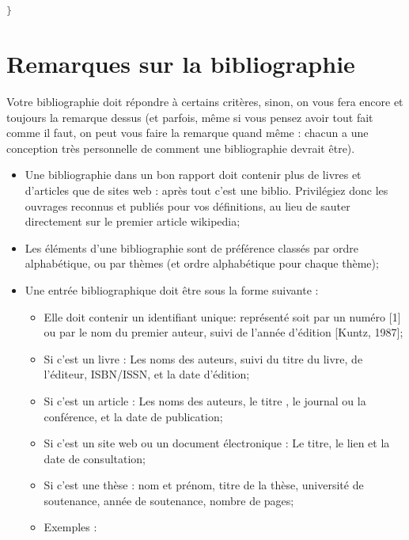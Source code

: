 \begin{spacing}{1.2}
\begin{lstlisting}[label=code:java,caption=Helloworld Java,language=java]
}
\end{lstlisting}

\section{Remarques sur la bibliographie}
Votre bibliographie doit répondre à certains critères, sinon, on vous fera encore et
toujours la remarque dessus (et parfois, même si vous pensez avoir tout fait comme il
 faut, on peut vous faire la remarque quand même : chacun a une conception très
personnelle de comment une bibliographie devrait être).\\
\begin{itemize}
\item Une bibliographie dans un bon rapport doit contenir plus de livres et d'articles 
que de sites web : après tout c'est une biblio. Privilégiez donc les ouvrages
reconnus et publiés pour vos définitions, au lieu de sauter directement sur le premier article wikipedia;
 \item Les éléments d'une bibliographie sont de préférence classés par ordre
alphabétique, ou par thèmes (et ordre alphabétique pour chaque thème);
\item Une entrée bibliographique doit être sous la forme suivante :
\begin{itemize}
\item Elle doit contenir un identifiant unique: représenté soit par un numéro
[1] ou par le nom du premier auteur, suivi de l'année d'édition [Kuntz, 1987];
\item Si c'est un livre : Les noms des auteurs, suivi du titre du livre, de l'éditeur, 
ISBN/ISSN, et la date d'édition;
\item Si c'est un article : Les noms des auteurs, le titre , le journal ou la
conférence, et la date de publication;
\item Si c'est un site web ou un document électronique : Le titre, le lien et la date 
de consultation;
\item Si c'est une thèse : nom et prénom, titre de la thèse, université de
soutenance, année de soutenance, nombre de pages;
\item Exemples : 
\end{itemize}
\end{itemize}
\end{spacing}

